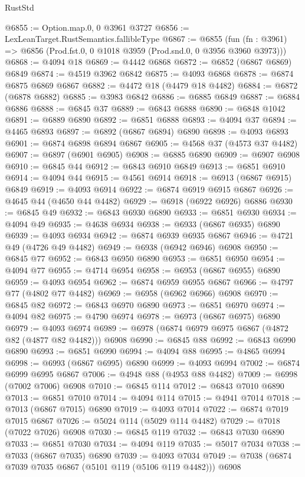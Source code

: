 \begin{lexlean}{RustStd}
\begin{coremodule}
@6855 := Option.map.{0, 0} @3961 @3727
@6856 := LexLeanTarget.RustSemantics.fallibleType
@6867 := @6855
    (fun (fn : @3961) => @6856 (Prod.fst.{0, 0} @1018 @3959 (Prod.snd.{0, 0} @3956 @3960 @3973)))
@6868 := @4094 @18
@6869 := @4442 @6868
@6872 := @6852 (@6867 @6869) @6849
@6874 := @4519 @3962 @6842
@6875 := @4093 @6868
@6878 := @6874 @6875 @6869 @6867
@6882 := @4472 @18 (@4479 @18 @4482)
@6884 := @6872 (@6878 @6882)
@6885 := @3983 @6842
@6886 := @6885 @6849
@6887 := @6884 @6886
@6888 := @6845 @37
@6889 := @6843 @6888
@6890 := @6848 @1042
@6891 := @6889 @6890
@6892 := @6851 @6888
@6893 := @4094 @37
@6894 := @4465 @6893
@6897 := @6892 (@6867 @6894) @6890
@6898 := @4093 @6893
@6901 := @6874 @6898 @6894 @6867
@6905 := @4568 @37 (@4573 @37 @4482)
@6907 := @6897 (@6901 @6905)
@6908 := @6885 @6890
@6909 := @6907 @6908
@6910 := @6845 @44
@6912 := @6843 @6910 @6849
@6913 := @6851 @6910
@6914 := @4094 @44
@6915 := @4561 @6914
@6918 := @6913 (@6867 @6915) @6849
@6919 := @4093 @6914
@6922 := @6874 @6919 @6915 @6867
@6926 := @4645 @44 (@4650 @44 @4482)
@6929 := @6918 (@6922 @6926) @6886
@6930 := @6845 @49
@6932 := @6843 @6930 @6890
@6933 := @6851 @6930
@6934 := @4094 @49
@6935 := @4638 @6934
@6938 := @6933 (@6867 @6935) @6890
@6939 := @4093 @6934
@6942 := @6874 @6939 @6935 @6867
@6946 := @4721 @49 (@4726 @49 @4482)
@6949 := @6938 (@6942 @6946) @6908
@6950 := @6845 @77
@6952 := @6843 @6950 @6890
@6953 := @6851 @6950
@6954 := @4094 @77
@6955 := @4714 @6954
@6958 := @6953 (@6867 @6955) @6890
@6959 := @4093 @6954
@6962 := @6874 @6959 @6955 @6867
@6966 := @4797 @77 (@4802 @77 @4482)
@6969 := @6958 (@6962 @6966) @6908
@6970 := @6845 @82
@6972 := @6843 @6970 @6890
@6973 := @6851 @6970
@6974 := @4094 @82
@6975 := @4790 @6974
@6978 := @6973 (@6867 @6975) @6890
@6979 := @4093 @6974
@6989 := @6978 (@6874 @6979 @6975 @6867 (@4872 @82 (@4877 @82 @4482))) @6908
@6990 := @6845 @88
@6992 := @6843 @6990 @6890
@6993 := @6851 @6990
@6994 := @4094 @88
@6995 := @4865 @6994
@6998 := @6993 (@6867 @6995) @6890
@6999 := @4093 @6994
@7002 := @6874 @6999 @6995 @6867
@7006 := @4948 @88 (@4953 @88 @4482)
@7009 := @6998 (@7002 @7006) @6908
@7010 := @6845 @114
@7012 := @6843 @7010 @6890
@7013 := @6851 @7010
@7014 := @4094 @114
@7015 := @4941 @7014
@7018 := @7013 (@6867 @7015) @6890
@7019 := @4093 @7014
@7022 := @6874 @7019 @7015 @6867
@7026 := @5024 @114 (@5029 @114 @4482)
@7029 := @7018 (@7022 @7026) @6908
@7030 := @6845 @119
@7032 := @6843 @7030 @6890
@7033 := @6851 @7030
@7034 := @4094 @119
@7035 := @5017 @7034
@7038 := @7033 (@6867 @7035) @6890
@7039 := @4093 @7034
@7049 := @7038 (@6874 @7039 @7035 @6867 (@5101 @119 (@5106 @119 @4482))) @6908

\end{coremodule}
\end{lexlean}
